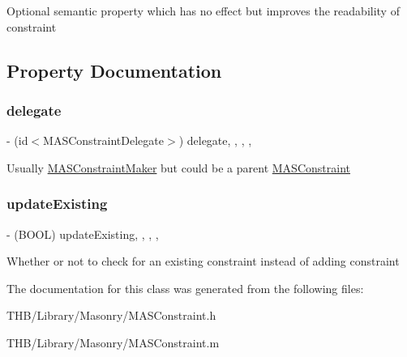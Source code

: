 Optional semantic property which has no effect but improves the readability of constraint 

\subsection{Property Documentation}
\mbox{\label{interface_m_a_s_constraint_a70e5195d18c9e75c8b226904ddc2d285}} 
\subsubsection{\texorpdfstring{delegate}{delegate}}
{\footnotesize\ttfamily -\/ (id$<$M\+A\+S\+Constraint\+Delegate$>$) delegate\hspace{0.3cm}{\ttfamily [read]}, {\ttfamily [write]}, {\ttfamily [nonatomic]}, {\ttfamily [weak]}, {\ttfamily [implementation]}}

Usually \mbox{\hyperlink{interface_m_a_s_constraint_maker}{M\+A\+S\+Constraint\+Maker}} but could be a parent \mbox{\hyperlink{interface_m_a_s_constraint}{M\+A\+S\+Constraint}} \mbox{\label{interface_m_a_s_constraint_aa3b903bceef8ceeb5c5f39d6b7690f3a}} 
\subsubsection{\texorpdfstring{update\+Existing}{updateExisting}}
{\footnotesize\ttfamily -\/ (B\+O\+OL) update\+Existing\hspace{0.3cm}{\ttfamily [read]}, {\ttfamily [write]}, {\ttfamily [nonatomic]}, {\ttfamily [assign]}, {\ttfamily [implementation]}}

Whether or not to check for an existing constraint instead of adding constraint 

The documentation for this class was generated from the following files\+:\begin{DoxyCompactItemize}
\item 
T\+H\+B/\+Library/\+Masonry/M\+A\+S\+Constraint.\+h\item 
T\+H\+B/\+Library/\+Masonry/M\+A\+S\+Constraint.\+m\end{DoxyCompactItemize}
